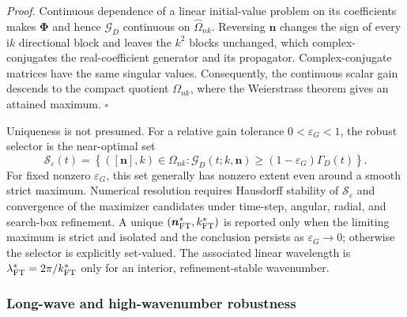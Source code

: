 \emph{Proof.}
Continuous dependence of a linear initial-value problem on its coefficients
makes $\boldsymbol\Phi$ and hence $\mathcal G_D$ continuous on
$\widehat\Omega_{nk}$.  Reversing $\boldsymbol n$ changes the
sign of every $\mathrm{i}k$ directional block and leaves the $k^2$ blocks
unchanged, which complex-conjugates the real-coefficient generator and its
propagator.  Complex-conjugate matrices have the same singular values.
Consequently, the continuous scalar gain descends to the compact quotient
$\Omega_{nk}$, where the Weierstrass theorem gives an attained maximum.
\hfill$\square$

Uniqueness is not presumed.  For a relative gain tolerance
$0<\varepsilon_G<1$, the robust selector is the near-optimal set
\begin{equation}
 \mathcal S_\varepsilon(t)
 =\left\{([\boldsymbol n],k)\in\Omega_{nk}:
 \mathcal G_D(t;k,\boldsymbol n)
 \ge(1-\varepsilon_G)\Gamma_D(t)\right\}.
 \label{eq:dyn_near_optimal_set}
\end{equation}
For fixed nonzero $\varepsilon_G$, this set generally has nonzero extent even
around a smooth strict maximum.  Numerical resolution requires Hausdorff
stability of $\mathcal S_\varepsilon$ and convergence of the maximizer candidates
under time-step, angular, radial, and search-box refinement.  A unique
$(\boldsymbol n_{\rm FT}^*,k_{\rm FT}^*)$ is reported only when the limiting
maximum is strict and isolated and the conclusion persists as
$\varepsilon_G\rightarrow0$; otherwise the selector is explicitly set-valued.
The associated linear wavelength is
$\lambda_{\rm FT}^*=2\pi/k_{\rm FT}^*$ only for an interior, refinement-stable
wavenumber.

\subsubsection{Long-wave and high-wavenumber robustness}

